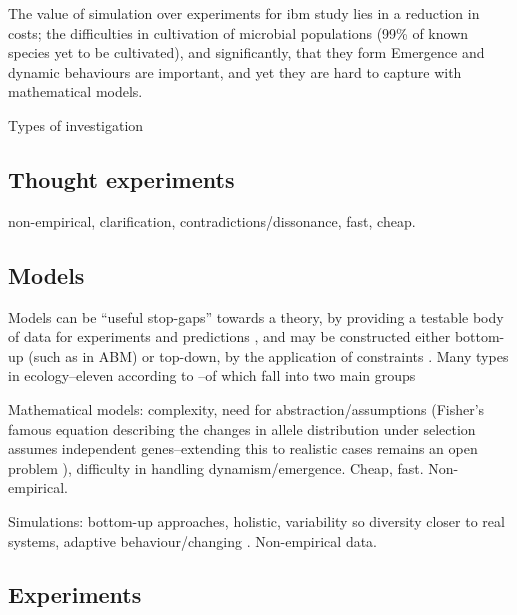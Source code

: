 The value of simulation over experiments for
\gls{ibm} study lies in a reduction in costs; the difficulties in
cultivation of microbial populations (99\% of known species yet to be
cultivated), and significantly, that they form  Emergence and
dynamic behaviours are important, and yet they are hard to capture with
mathematical models.

Types of investigation

\subsection{Thought experiments}\label{thought-experiments}

non-empirical, clarification, contradictions/dissonance, fast, cheap.

\subsection{Models}\label{models}


Models can be ``useful stop-gaps'' towards a theory, by providing a
testable body of data for experiments and predictions
\autocite{Krakauer2011}, and may be constructed either bottom-up (such
as in ABM) or top-down, by the application of constraints
\autocite{Krakauer2011}. Many types in \eg ecology--eleven according to
\autocite{Jorgensen2008}--of which fall into two main groups

Mathematical models: complexity, need for abstraction/assumptions
(\eg Fisher's famous equation describing the changes in allele
distribution under selection assumes independent genes--extending this
to realistic cases remains an open problem \autocite{Schuster2011}),
difficulty in handling dynamism/emergence. Cheap, fast. Non-empirical.

Simulations: bottom-up approaches, holistic, variability so diversity
closer to real systems, adaptive behaviour/changing
\autocite{Ferrer:2008hv}. Non-empirical data.

\subsection{Experiments}\label{experiments}

